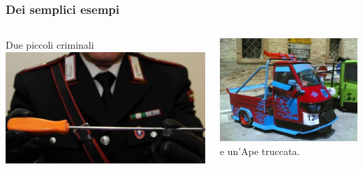 \documentclass[13pt]{beamer}
\begin{document}
	\begin{frame}
		\frametitle{Dei semplici esempi}
		\begin{columns}[T]
			\begin{column}{.5\textwidth}
				\begin{block}{}
					Due piccoli criminali \\
					\includegraphics[width=\textwidth]{pics/cacciavite.jpg}
				\end{block}
			\end{column}
			\begin{column}{.5\textwidth}
				\begin{block}{}
					\includegraphics[width=\textwidth]{pics/ape.jpg}
					\\ e un'Ape truccata.
				\end{block}
			\end{column}
		\end{columns}
	\end{frame}
	
\end{document}
